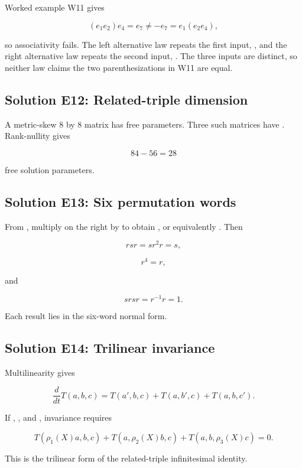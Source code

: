 \documentclass[11pt]{article}
\begin{document}
Worked example W11 gives

\[
(e_1e_2)e_4=e_7\ne-e_7=e_1(e_2e_4),
\]

so associativity fails. The left alternative law repeats the first input, \texttt{}, and the right alternative law repeats the second input, \texttt{}. The three inputs \texttt{} are distinct, so neither law claims the two parenthesizations in W11 are equal.

\subsection{Solution E12: Related-triple dimension}

A metric-skew 8 by 8 matrix has \texttt{} free parameters. Three such matrices have \texttt{}. Rank-nullity gives

\[
84-56=28
\]

free solution parameters.

\subsection{Solution E13: Six permutation words}

From \texttt{}, multiply on the right by \texttt{} to obtain \texttt{}, or equivalently \texttt{}. Then

\[
rsr=sr^2r=s,
\]

\[
r^4=r,
\]

and

\[
srsr=r^{-1}r=1.
\]

Each result lies in the six-word normal form.

\subsection{Solution E14: Trilinear invariance}

Multilinearity gives

\[
\frac{d}{dt}T(a,b,c)=T(a',b,c)+T(a,b',c)+T(a,b,c').
\]

If \texttt{}, \texttt{}, and \texttt{}, invariance requires

\[
T(\rho_1(X)a,b,c)+T(a,\rho_2(X)b,c)
+T(a,b,\rho_3(X)c)=0.
\]

This is the trilinear form of the related-triple infinitesimal identity.
\end{document}
